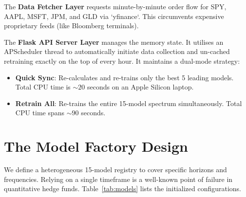 \documentclass[journal,10pt,twocolumn]{IEEEtran}
\begin{document}
The \textbf{Data Fetcher Layer} requests minute-by-minute order flow for SPY, AAPL, MSFT, JPM, and GLD via `yfinance`. This circumvents expensive proprietary feeds (like Bloomberg terminals).

The \textbf{Flask API Server Layer} manages the memory state. It utilises an APScheduler thread to automatically initiate data collection and un-cached retraining exactly on the top of every hour. It maintains a dual-mode strategy:
\begin{itemize}
    \item \textbf{Quick Sync}: Re-calculates and re-trains only the best 5 leading models. Total CPU time is ${\sim}20$ seconds on an Apple Silicon laptop.
    \item \textbf{Retrain All}: Re-trains the entire 15-model spectrum simultaneously. Total CPU time spans ${\sim}90$ seconds.
\end{itemize}

\section{The Model Factory Design}
\label{sec:factory}

We define a heterogeneous 15-model registry to cover specific horizons and frequencies. Relying on a single timeframe is a well-known point of failure in quantitative hedge funds. Table~\ref{tab:models} lists the initialized configurations.
\end{document}
